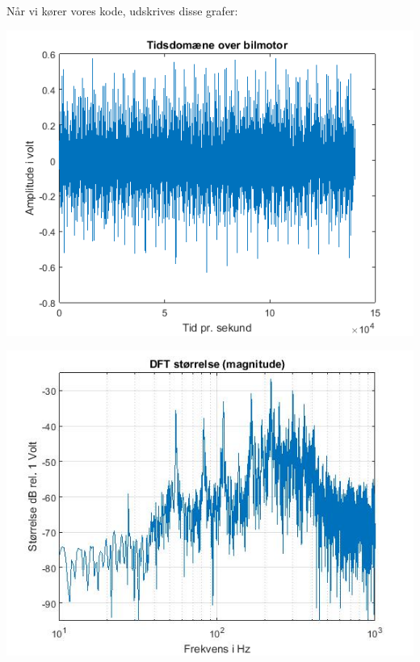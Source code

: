 \documentclass[12pt, letterpaper]{article}
\begin{document}
Når vi kører vores kode, udskrives disse grafer: 

\begin{center}
\includegraphics[width=\textwidth]{billeder/bilmotortids}
\end{center}

\begin{center}
\includegraphics[width=\textwidth]{billeder/storrelsebilmotor}
\end{center}
\end{document}
